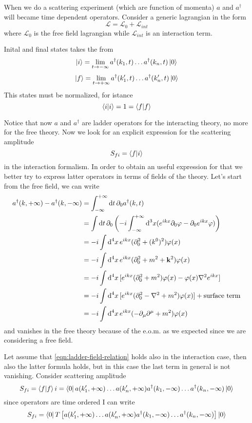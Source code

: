 \documentclass[../main/main.tex]{subfiles}
\let\temp\phi
\let\phi\varphi
\let\varphi\temp
\begin{document}
When we do a scattering experiment (which are function of momenta) $a$ and $a^\dagger$ will became time dependent operators. Consider a generic lagrangian in the form
\[\mathcal L=\mathcal L_0+\mathcal L_{int}\]
where $\mathcal L_0$ is the free field lagrangian while $\mathcal L_{int}$ is an interaction term.

Inital and final states takes the from
\[\ket i=\lim_{t\rightarrow -\infty}a^\dagger(k_1,t)\dots a^\dagger(k_n,t)\ket0\]
\[\ket f=\lim_{t\rightarrow +\infty}a^\dagger(k_1',t)\dots a^\dagger(k'_n,t)\ket0\]
This states must be normalized, for istance
\[\braket i=1=\braket f\]

Notice that now $a$ and $a^\dagger$ are ladder operators for the interacting theory, no more for the free theory. Now we look for an explicit expression for the scattering amplitude
\[S_{fi}=\braket {f}{i}\]
in the interaction formalism.
In order to obtain an useful expression for that we better try to express latter operators in terms of fields of the theory.
Let's start from the free field, we can write
\begin{equation}\label{eqn:ladder-inf-diff}\begin{split}
a^\dagger(k,+\infty)-a^\dagger(k, -\infty)
&=\int_{-\infty}^{+\infty}\de t\,\partial_0a^\dagger(k,t)\\
&=\int\de t\,\partial_0\left(-i\int_{-\infty}^{+\infty}\de^3x(e^{ikx}\partial_0\phi-\partial_0e^{ikx}\phi)\right)\\
&=-i\int\de^4x\,e^{ikx}(\partial_0^2+(k^0)^2)\phi(x)\\
&=-i\int\de^4x\,e^{ikx}(\partial_0^2+m^2+\vec k^2)\phi(x)\\
&=-i\int\de^4x\,[e^{ikx}(\partial_0^2+m^2)\phi(x)-\phi(x)\vect{\nabla}^2e^{ikx}]\\
&=-i\int\de^4x\,[e^{ikx}(\partial_0^2-\vect{\nabla}^2+m^2)\phi(x)] + \text{surface term}\\
&=-i\int\de^4x\,e^{ikx}(-\partial_\mu\partial^\mu+m^2)\phi(x)
\end{split}\end{equation}
and vanishes in the free theory because of the e.o.m. as we expected since we are considering a free field.

Let assume that \eqref{eqn:ladder-field-relation} holds also in the interaction case, then also the latter formula holds, but in this case the last term in general is not vanishing. 
Consider scattering amplitude
\[S_{fi}=\braket fi=\bra0a(k_1',+\infty)\dots a(k'_n,+\infty)a^\dagger(k_1,-\infty)\dots a^\dagger(k_n,-\infty)\ket0
\]
since operators are time ordered I can write
\[S_{fi}=\bra0T\left[a(k_1',+\infty)\dots a(k'_n,+\infty)a^\dagger(k_1,-\infty)\dots a^\dagger(k_n,-\infty)\right]\ket0
\]
\end{document}
